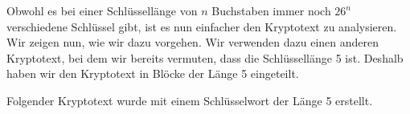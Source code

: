 Obwohl es bei einer Schlüssellänge von $n$ Buchstaben immer noch $26^n$ verschiedene Schlüssel gibt, ist es nun einfacher den Kryptotext zu analysieren. Wir zeigen nun, wie wir dazu vorgehen. Wir verwenden dazu einen anderen Kryptotext, bei dem wir bereits vermuten, dass die Schlüssellänge \num{5} ist. Deshalb haben wir den Kryptotext in Blöcke der Länge \num{5} eingeteilt.\\

\begin{example}
Folgender Kryptotext wurde mit einem Schlüsselwort der Länge \num{5} erstellt.
\label{example-kryptotext-kasiski-2}


\end{example}
